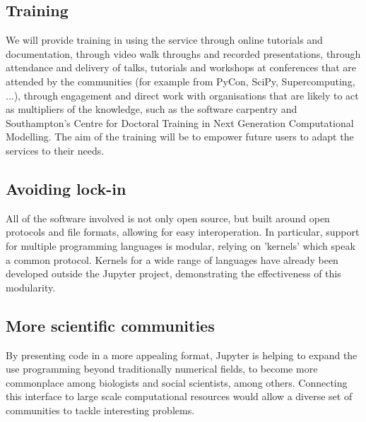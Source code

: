 
\subsection{Training}

We will provide training in using the service through online tutorials
and documentation, through video walk throughs and recorded
presentations, through attendance and delivery of talks, tutorials and
workshops at conferences that are attended by the communities (for
example from PyCon, SciPy, Supercomputing, ...), through engagement
and direct work with organisations that are likely to act as
multipliers of the knowledge, such as the software carpentry and
Southampton's Centre for Doctoral Training in Next Generation
Computational Modelling. The aim of the training will be to empower
future users to adapt the services to their needs.



\subsection{Avoiding lock-in}

All of the software involved is not only open source, but built around open
protocols and file formats, allowing for easy interoperation. In particular,
support for multiple programming languages is modular, relying on 'kernels'
which speak a common protocol. Kernels for a wide range of languages have
already been developed outside the Jupyter project, demonstrating the
effectiveness of this modularity.


\subsection{More scientific communities}

By presenting code in a more appealing format, Jupyter is helping to expand
the use programming beyond traditionally numerical fields, to become more
commonplace among biologists and social scientists, among others. Connecting
this interface to large scale computational resources would allow a diverse set
of communities to tackle interesting problems.


